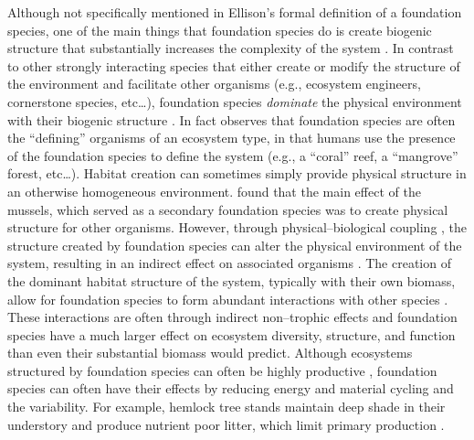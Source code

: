 \documentclass{article}
\begin{document}
Although not specifically mentioned in Ellison's formal definition of a foundation species, one of the main things that foundation species do is create biogenic structure that substantially increases the complexity of the system \cite{lenihan_physicalbiological_1999, ellison_loss_2005, ellison_foundation_2019, vozzo_co-occuring_2019, fields_foundation_2022, searles_oyster_2022}. In contrast to other strongly interacting species that either create or modify the structure of the environment and facilitate other organisms (e.g., ecosystem engineers, cornerstone species, etc\ldots), foundation species \emph{dominate} the physical environment with their biogenic structure \cite{ellison_foundation_2019}. In fact  observes that foundation species are often the ``defining'' organisms of an ecosystem type, in that humans use the presence of the foundation species to define the system (e.g., a ``coral'' reef, a ``mangrove'' forest, etc\ldots). Habitat creation can sometimes simply provide physical structure in an otherwise homogeneous environment.  found that the main effect of the mussels, which served as a secondary foundation species was to create physical structure for other organisms. However, through physical--biological coupling \cite{lenihan_physicalbioligical_1999}, the structure created by foundation species can alter the physical environment of the system, resulting in an indirect effect on associated organisms \cite{searles_oyster_2022}. The creation of the dominant habitat structure of the system, typically with their own biomass, allow for foundation species to form abundant interactions with other species \cite{ellison_foundation_2019}. These interactions are often through indirect non--trophic effects \cite{ellison_foundation_1999} and foundation species have a much larger effect on ecosystem diversity, structure, and function than even their substantial biomass would predict. Although ecosystems structured by foundation species can often be highly productive \cite{wong_evaluating_2011}, foundation species can often have their effects by reducing energy and material cycling and the variability. For example, hemlock tree stands maintain deep shade in their understory and produce nutrient poor litter, which limit primary production \cite{ellison_loss_2005}. %
\end{document}
